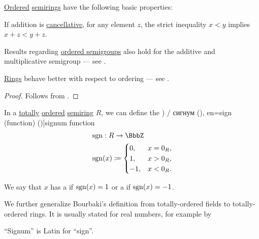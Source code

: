 \begin{proposition}\label{thm:def:ordered_semiring}
  \hyperref[def:ordered_semiring]{Ordered} \hyperref[def:semiring]{semirings} have the following basic properties:
  \begin{thmenum}
     If addition is \hyperref[def:binary_operation/cancellative]{cancellative}, for any element \( z \), the strict inequality \( x < y \) implies \( x + z < y + z \).
  \end{thmenum}
\end{proposition}
\begin{comments}
  \item Results regarding \hyperref[def:ordered_semigroup]{ordered semigroups} also hold for the additive and multiplicative semigroup --- see .
  \item \hyperref[def:ring]{Rings} behave better with respect to ordering --- see .
\end{comments}
\begin{proof}
   Follows from .
\end{proof}

\begin{definition}\label{def:signum}
  In a \hyperref[def:totally_ordered_set]{totally} \hyperref[def:ordered_semiring]{ordered} \hyperref[def:semiring]{semiring} \( R \), we can define the \term[ru=знак (\cite[208]{АлександровМаркушевичХинчин1952ЭнциклопедияТом3}) / сигнум (\cite[100]{Зорич2019АнализТом1}), en=sign (function) (\cite[\S 2.2(c)]{Schechter1997AnalysisHandbook})]{signum} function
  \begin{equation*}
    \begin{aligned}
      &\sgn: R \to \BbbZ \\
      &\sgn(x) \coloneqq \begin{cases}
        0,  &x = 0_R, \\
        1,  &x > 0_R, \\
        -1, &x < 0_R.
      \end{cases}
    \end{aligned}
  \end{equation*}

  We say that \( x \) has a  if \( \operatorname{sgn}(x) = 1 \) or a  if \( \operatorname{sgn}(x) = -1 \).
\end{definition}
\begin{comments}
  \item We further generalize Bourbaki's definition from totally-ordered fields to totally-ordered rings. It is usually stated for real numbers, for example by

  \item \enquote{Signum} is Latin for \enquote{sign}.
\end{comments}

